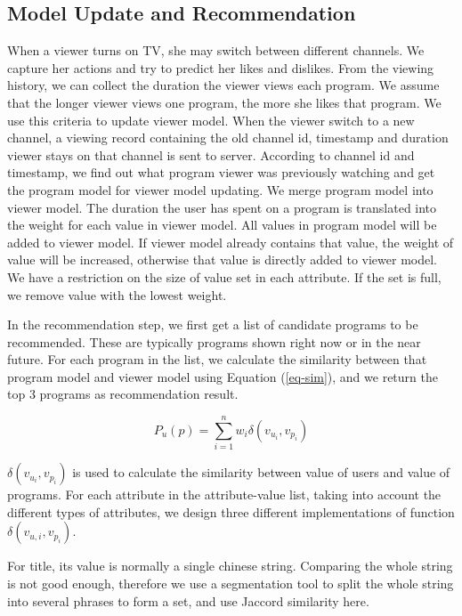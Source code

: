 \subsection{Model Update and Recommendation}
When a viewer turns on TV, she may switch between different channels.
We capture her actions and try to predict her likes and dislikes. 
From the viewing history, we can collect the duration the viewer
views each program. We assume that the longer viewer views one program, 
the more she likes that program. 
We use this criteria to update viewer model. 
When the viewer switch to a new channel, 
a viewing record containing the old channel id, 
timestamp and duration viewer stays on that
channel is sent to server. According to channel id and timestamp, 
we find out what program viewer was previously 
watching and get the program model for viewer model updating. 
We merge program model into viewer model. 
The duration the user has spent on a program is translated into
the weight for each value in viewer model. 
All values in program model will be added to viewer model. 
If viewer model already contains that value, the weight of value will be
increased, otherwise that value is directly added to viewer model. 
We have a restriction on the size of value
set in each attribute. If the set is full, 
we remove value with the lowest weight. 

In the recommendation step, we first get a list of candidate programs to
be recommended. These are typically programs shown right now or in the near 
future. For each program in the list, we calculate the similarity 
between that program model and viewer model using Equation (\ref{eq-sim}),
and we return the top 3 programs as recommendation result. 

\begin{equation}
P_u(p) = \sum_{i=1}^nw_i\delta(v_{u_i},v_{p_i})
\label{eq-sim}
\end{equation}

$\delta(v_{u_i}, v_{p_i})$ is used to calculate the similarity between value of users and value of programs.
For each attribute in the attribute-value list, 
taking into account the different types of attributes, we design three
different implementations of function $\delta(v_{u, i}, v_{p_i})$.

For title, its value is normally a single chinese string. 
Comparing the whole string is not good enough,
therefore we use a segmentation tool to split the whole string 
into several phrases to form a set, and use Jaccord similarity here.

